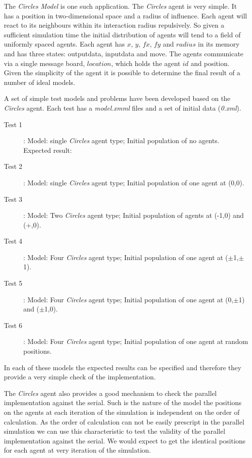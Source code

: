 The \textsl{Circles Model} is one such application. The \textsl{Circles} agent is very simple. It has a position in two-dimensional space and a radius of influence. Each agent will react to its neighbours within its interaction radius repulsively. So given a sufficient simulation time the initial distribution of agents will tend to a field of uniformly spaced agents. Each agent has $x$, $y$, $fx$, $fy$ and $radius$ in its memory and has three states: outputdata, inputdata and move. The agents communicate via a single message board, $location$, which holds the agent $id$ and position. Given the simplicity of the agent it is possible to determine the final result of a number of ideal models.

A set of simple test models and problems have been developed based on the \textsl{Circles} agent. Each test has a \textsl{model.xmml} files and a set of initial data (\textsl{0.xml}).
\begin{description}
	\item [Test 1]: Model: single \textsl{Circles} agent type; Initial population of no agents. Expected result:
	\item [Test 2]: Model: single \textsl{Circles} agent type; Initial population of one agent at (0,0).
	\item [Test 3]: Model: Two \textsl{Circles} agent type; Initial population of agents at (-1,0) and (+,0).
	\item [Test 4]: Model: Four \textsl{Circles} agent type; Initial population of one agent at ($\pm$1,$\pm$1).
	\item [Test 5]: Model: Four \textsl{Circles} agent type; Initial population of one agent at (0,$\pm$1) and ($\pm$1,0).
	\item [Test 6]: Model: Four \textsl{Circles} agent type; Initial population of one agent at random positions.
	\end{description}
In each of these models the expected results can be specified and therefore they provide a very simple check of the implementation.

The \textsl{Circles} agent also provides a good mechanism to check the parallel implementation against the serial. Such is the nature of the model the positions on the agents at each iteration of the simulation is independent on the order of calculation. As the order of calculation can not be easily prescript in the parallel simulation we can use this characteristic to test the validity of the parallel implementation against the serial. We would expect to get the identical positions for each agent at very iteration of the simulation.

